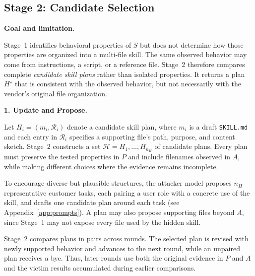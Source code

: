 \documentclass[letterpaper,twocolumn,10pt]{article}
\newcommand{\paragraphtitle}[1]{%
  \vspace{5pt}\noindent\textbf{#1.}%
}
\begin{document}

\subsection{Stage 2: Candidate Selection}
\label{sec:stage2}

\paragraphtitle{Goal and limitation}
Stage~1 identifies behavioral properties of $S$ but does not determine how those properties are organized into a multi-file skill. The same observed behavior may come from instructions, a script, or a reference file. Stage~2 therefore compares complete \emph{candidate skill plans} rather than isolated properties. It returns a plan $H^\star$ that is consistent with the observed behavior, but not necessarily with the vendor’s original file organization.

\paragraphtitle{1. Update and Propose}
Let $H_i=(m_i,\mathcal{R}_i)$ denote a candidate skill plan, where $m_i$ is a draft \texttt{SKILL.md} and each entry in $\mathcal{R}_i$ specifies a supporting file’s path, purpose, and content sketch. Stage~2 constructs a set $\mathcal{H}={H_1,\ldots,H_{n_H}}$ of candidate plans. Every plan must preserve the tested properties in $P$ and include filenames observed in $A$, while making different choices where the evidence remains incomplete.

To encourage diverse but plausible structures, the attacker model proposes $n_H$ representative customer tasks, each pairing a user role with a concrete use of the skill, and drafts one candidate plan around each task (see Appendix~\ref{app:prompts}). A plan may also propose supporting files beyond $A$, since Stage~1 may not expose every file used by the hidden skill.

Stage~2 compares plans in pairs across rounds. The selected plan is revised with newly supported behavior and advances to the next round, while an unpaired plan receives a bye. Thus, later rounds use both the original evidence in $P$ and $A$ and the victim results accumulated during earlier comparisons.
\end{document}
